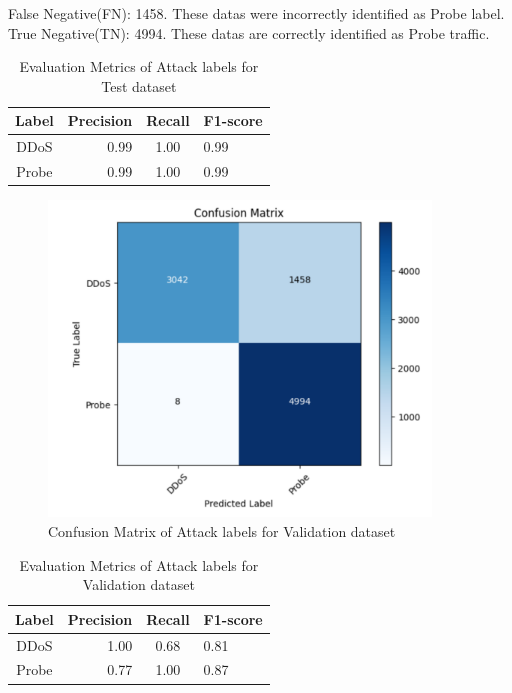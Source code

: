 False Negative(FN): 1458. These datas were incorrectly identified as Probe label.\\
True Negative(TN): 4994. These datas are correctly identified as Probe traffic.\par 
\begin{table}[tbh]
	\centering
	\begin{tabular}{|c|r|c|l|} %
		\hline %
		Label  &Precision &Recall &F1-score \\
		\hline %
		DDoS &0.99 &1.00 &0.99 \\
		\hline %
		Probe &0.99 &1.00 &0.99\\
		\hline
	\end{tabular}
	\caption{Evaluation Metrics of Attack labels for Test dataset}
	\label{Evaluation Metrics of Attack labels for test dataset}
\end{table}
\begin{figure}[tbh] %
	\begin{center}
		\includegraphics[width=4in]{images/valattacksmat.png} 
		\caption{Confusion Matrix of Attack labels for Validation dataset} %
		\label{Confusion Matrix of Attack labels for Validation dataset} 
	\end{center}
\end{figure}
\begin{table}[tbh]
	\centering
	\begin{tabular}{|c|r|c|l|} %
		\hline %
		Label  &Precision &Recall &F1-score\\
		\hline %
		DDoS &1.00 &0.68 &0.81\\
		\hline %
		Probe &0.77 &1.00 &0.87\\
		\hline
	\end{tabular}
	\caption{Evaluation Metrics of Attack labels for Validation dataset}
	\label{Evaluation Metrics of Attack labels for validation dataset}
\end{table}
